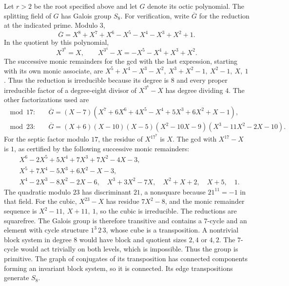 \documentclass[11pt]{article}
\begin{document}
Let \(r>2\) be the root specified above and let \(G\) denote its
octic polynomial. The splitting field of \(G\) has Galois group
\(S_8\). For verification, write \(\overline G\) for the reduction
at the indicated prime. Modulo \(3\),
\[
 \overline G=X^8+X^7+X^6-X^5-X^4-X^3+X^2+1 .
\]
In the quotient by this polynomial,
\[
 X^{3^8}=X,\qquad
 X^{3^4}-X=-X^5-X^4+X^3+X^2 .
\]
The successive monic remainders for the gcd with the last
expression, starting with its own monic associate, are
\(X^5+X^4-X^3-X^2,\ X^3+X^2-1,\ X^2-1,\ X,\ 1\).
Thus the reduction is irreducible because its degree is \(8\)
and every proper irreducible factor of a degree-eight divisor
of \(X^{3^8}-X\) has degree dividing \(4\).
The other factorizations used are
\begin{align*}
 \bmod 17:\quad
 &\overline G=(X-7)
       (X^7+6X^6+4X^5-X^4+5X^3+6X^2+X-1),\\
 \bmod 23:\quad
 &\overline G=(X+6)(X-10)(X-5)
       (X^2-10X-9)(X^3-11X^2-2X-10).
\end{align*}
For the septic factor modulo \(17\), the residue of \(X^{17^7}\)
is \(X\). The gcd with \(X^{17}-X\) is \(1\), as certified by
the following successive monic remainders:
\begin{align*}
 &X^6-2X^5+5X^4+7X^3+7X^2-4X-3,\\
 &X^5+7X^4-5X^3+6X^2-X-3,\\
 &X^4-2X^3-8X^2-2X-6,\quad X^3+3X^2-7X,\quad X^2+X+2,\quad X+5,\quad 1 .
\end{align*}
The quadratic modulo \(23\) has discriminant \(21\), a nonsquare
because \(21^{11}=-1\) in that field. For the cubic,
\(X^{23}-X\) has residue \(7X^2-8\), and the monic remainder
sequence is \(X^2-11,\ X+11,\ 1\), so the cubic is irreducible.
The reductions are squarefree. The Galois group is therefore
transitive and contains a \(7\)-cycle and an element with cycle
structure \(1^3\,2\,3\), whose cube is a transposition.
A nontrivial block system in degree \(8\) would have block and
quotient sizes \(2,4\) or \(4,2\). The \(7\)-cycle would act trivially
on both levels, which is impossible. Thus the group is primitive.
The graph of conjugates of its transposition has connected
components forming an invariant block system, so it is connected.
Its edge transpositions generate \(S_8\).
\end{document}
